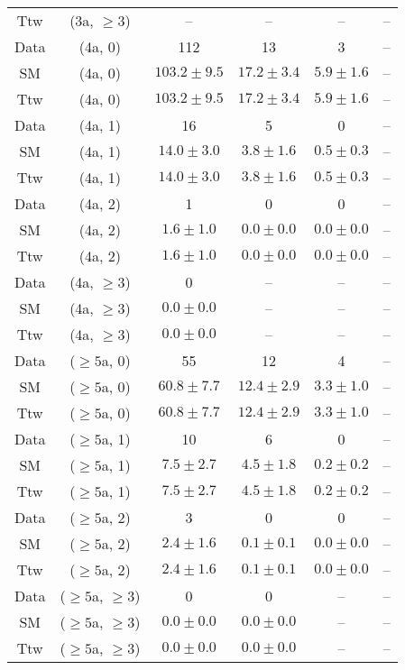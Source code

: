 \begin{table}[h!]
{\begin{tabular}{cccccc}
	Ttw & (3a, $\ge3$) & -- & -- & -- & -- \\[0.5ex] 
	Data & (4a, 0) & 112 & 13 & 3 & -- \\[0.5ex] 
	SM & (4a, 0) & $103.2\pm 9.5$ & $17.2\pm 3.4$ & $5.9\pm 1.6$ & -- \\[0.5ex] 
	Ttw & (4a, 0) & $103.2\pm 9.5$ & $17.2\pm 3.4$ & $5.9\pm 1.6$ & -- \\[0.5ex] 
	Data & (4a, 1) & 16 & 5 & 0 & -- \\[0.5ex] 
	SM & (4a, 1) & $14.0\pm 3.0$ & $3.8\pm 1.6$ & $0.5\pm 0.3$ & -- \\[0.5ex] 
	Ttw & (4a, 1) & $14.0\pm 3.0$ & $3.8\pm 1.6$ & $0.5\pm 0.3$ & -- \\[0.5ex] 
	Data & (4a, 2) & 1 & 0 & 0 & -- \\[0.5ex] 
	SM & (4a, 2) & $1.6\pm 1.0$ & $0.0\pm 0.0$ & $0.0\pm 0.0$ & -- \\[0.5ex] 
	Ttw & (4a, 2) & $1.6\pm 1.0$ & $0.0\pm 0.0$ & $0.0\pm 0.0$ & -- \\[0.5ex] 
	Data & (4a, $\ge3$) & 0 & -- & -- & -- \\[0.5ex] 
	SM & (4a, $\ge3$) & $0.0\pm 0.0$ & -- & -- & -- \\[0.5ex] 
	Ttw & (4a, $\ge3$) & $0.0\pm 0.0$ & -- & -- & -- \\[0.5ex] 
	Data & ($\ge5$a, 0) & 55 & 12 & 4 & -- \\[0.5ex] 
	SM & ($\ge5$a, 0) & $60.8\pm 7.7$ & $12.4\pm 2.9$ & $3.3\pm 1.0$ & -- \\[0.5ex] 
	Ttw & ($\ge5$a, 0) & $60.8\pm 7.7$ & $12.4\pm 2.9$ & $3.3\pm 1.0$ & -- \\[0.5ex] 
	Data & ($\ge5$a, 1) & 10 & 6 & 0 & -- \\[0.5ex] 
	SM & ($\ge5$a, 1) & $7.5\pm 2.7$ & $4.5\pm 1.8$ & $0.2\pm 0.2$ & -- \\[0.5ex] 
	Ttw & ($\ge5$a, 1) & $7.5\pm 2.7$ & $4.5\pm 1.8$ & $0.2\pm 0.2$ & -- \\[0.5ex] 
	Data & ($\ge5$a, 2) & 3 & 0 & 0 & -- \\[0.5ex] 
	SM & ($\ge5$a, 2) & $2.4\pm 1.6$ & $0.1\pm 0.1$ & $0.0\pm 0.0$ & -- \\[0.5ex] 
	Ttw & ($\ge5$a, 2) & $2.4\pm 1.6$ & $0.1\pm 0.1$ & $0.0\pm 0.0$ & -- \\[0.5ex] 
	Data & ($\ge5$a, $\ge3$) & 0 & 0 & -- & -- \\[0.5ex] 
	SM & ($\ge5$a, $\ge3$) & $0.0\pm 0.0$ & $0.0\pm 0.0$ & -- & -- \\[0.5ex] 
	Ttw & ($\ge5$a, $\ge3$) & $0.0\pm 0.0$ & $0.0\pm 0.0$ & -- & -- \\[0.5ex] 
	\hline
	\hline
\end{tabular}}
\end{table}
